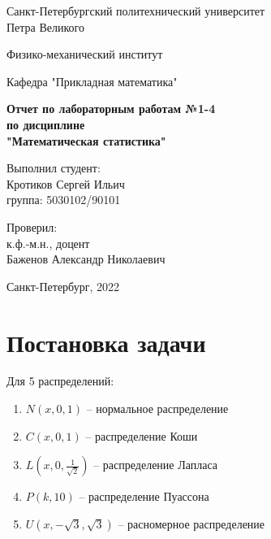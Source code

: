 \documentclass[a4paper]{article}
\begin{document}
\begin{center}
  	Санкт-Петербургский политехнический университет\\
  	Петра Великого
  	\vspace{5ex}
  	
  	Физико-механический институт 
  	\vspace{1ex}
  	
  	Кафедра "Прикладная математика"
  	\vspace{20ex}
  	
  	\textbf{Отчет по лабораторным работам №1-4 \\ 
  			по дисциплине \\
  			"Математическая статистика"}\\
  	\vspace{25ex}
\end{center}
\begin{flushright}
  	\noindent 
  	Выполнил студент: \hspace{5ex} \\
  	\vspace{0.5ex}
  	Кротиков Сергей Ильич \\
  	группа: 5030102/90101 
  	\vspace{0.5ex}
  	
  	Проверил: \\
  	\vspace{0.5ex}
  	к.ф.-м.н., доцент \\
  	Баженов Александр Николаевич
\end{flushright}
\begin{center}
  	\vfill
  	Санкт-Петербург, 2022
\end{center}
\newpage
\begin{center}
    \setcounter{page}{2}
    \tableofcontents
\end{center}
\newpage
\begin{center}
    \setcounter{page}{3}
    \listoffigures
\end{center}

\newpage

\section {Постановка задачи}
\noindent Для 5 распределений:
\begin{enumerate}
	\item $N(x, 0, 1)$ -- нормальное распределение
	\item $C(x, 0, 1)$ -- распределение Коши
	\item $L(x, 0, \frac{1}{\sqrt{2}})$ -- распределение Лапласа 
	\item $P(k, 10)$ -- распределение Пуассона
	\item $U(x, -\sqrt{3}, \sqrt{3})$ -- расномерное распределение
\end{enumerate}
\end{document}
